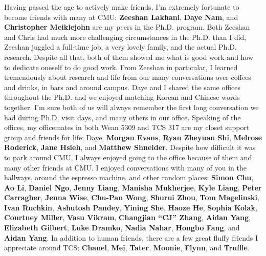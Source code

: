 Having passed the age to actively make friends, I'm extremely fortunate to become friends with many at CMU: \textbf{Zeeshan Lakhani}, \textbf{Daye Nam}, and \textbf{Christopher Meiklejohn} are my peers in the Ph.D. program. Both Zeeshan and Chris had much more challenging circumstances in the Ph.D. than I did, \eg Zeeshan juggled a full-time job, a very lovely family, and the actual Ph.D. research. Despite all that, both of them showed me what is good work and how to dedicate oneself to do good work. From Zeeshan in particular, I learned tremendously about research and life from our many conversations over coffees and drinks, in bars and around campus. Daye and I shared the same offices throughout the Ph.D. and we enjoyed matching Korean and Chinese words together. I'm sure both of us will always remember the first long conversation we had during Ph.D. visit days, and many others in our office. Speaking of the offices, my officemates in both Wean 5309 and TCS 317 are my closet support group and friends for life: Daye, \textbf{Morgan Evans}, \textbf{Ryan Zheyuan Shi}, \textbf{Melrose Roderick}, \textbf{Jane Hsieh}, and \textbf{Matthew Shneider}. Despite how difficult it was to park around CMU, I always enjoyed going to the office because of them and many other friends at CMU. I enjoyed conversations with many of you in the hallways, around the espresso machine, and other random places: \textbf{Simon Chu}, \textbf{Ao Li}, \textbf{Daniel Ngo}, \textbf{Jenny Liang}, \textbf{Manisha Mukherjee}, \textbf{Kyle Liang}, \textbf{Peter Carragher}, \textbf{Jenna Wise}, \textbf{Chu-Pan Wong}, \textbf{Shurui Zhou}, \textbf{Tom Magelinski}, \textbf{Ivan Ruchkin}, \textbf{Ashutosh Pandey}, \textbf{Yining She}, \textbf{Haoze He}, \textbf{Sophia Kolak}, \textbf{Courtney Miller}, \textbf{Vasu Vikram}, \textbf{Changjian ``CJ'' Zhang}, \textbf{Aidan Yang}, \textbf{Elizabeth Gilbert}, \textbf{Luke Dramko}, \textbf{Nadia Nahar}, \textbf{Hongbo Fang}, and \textbf{Aidan Yang}. In addition to human friends, there are a few great fluffy friends I appreciate around TCS: \textbf{Chanel}, \textbf{Mei}, \textbf{Tater}, \textbf{Moonie}, \textbf{Flynn}, and \textbf{Truffle}. 

